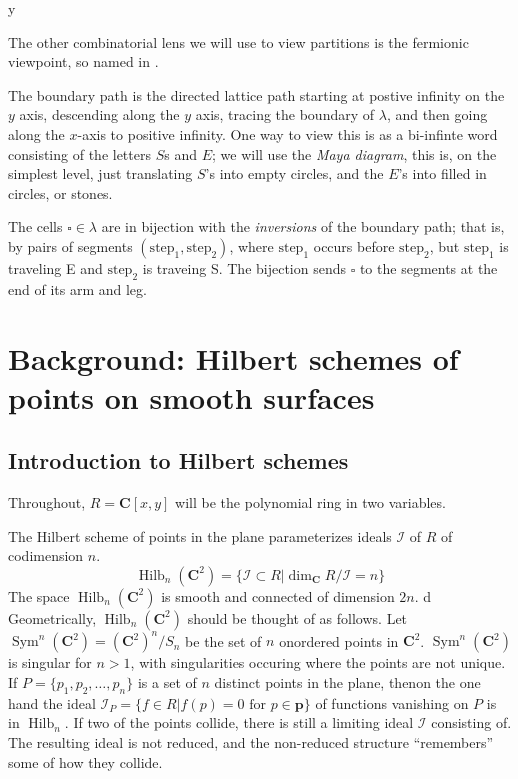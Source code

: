 y\documentclass{amsart}[12pt]
\theoremstyle{definition}
\newcommand{\C}{\mathbf{C}}
\DeclareMathOperator{\Hilb}{Hilb}
\DeclareMathOperator{\Sym}{Sym}
\begin{document}
The other combinatorial lens we will use to view partitions is the fermionic viewpoint, so named in .  

The boundary path is the directed lattice path starting at postive infinity on the $y$ axis, descending along the $y$ axis, tracing the boundary of $\lambda$, and then going along the $x$-axis to positive infinity.  One way to view this is as a bi-infinte word consisting of the letters $S$s and $E$; we will use the \emph{Maya diagram}, this is, on the simplest level, just translating $S$'s into empty circles, and the $E$'s into filled in circles, or stones.  



The cells $\square\in\lambda$ are in bijection with the
\emph{inversions} of the boundary path; that is, by pairs of segments
$(\text{step}_1, \text{step}_2)$, where $\text{step}_1$ occurs before $\text{step}_2$, but $\text{step}_1$ is traveling E and $\text{step}_2$ is traveing S.  The bijection sends $\square$ to the segments at the end of its arm and leg.





\section{Background: Hilbert schemes of points on smooth surfaces}
\label{sec:smoothbackground}



\subsection{Introduction to Hilbert schemes}

Throughout, $R=\C[x,y]$ will be the polynomial ring in two variables.  

The Hilbert scheme of points in the plane parameterizes ideals $\mathcal{I}$ of $R$ of codimension $n$.
$$\Hilb_n(\C^2)=\{\mathcal{I}\subset R | \dim_\C R/\mathcal{I}=n\}$$
The space $\Hilb_n(\C^2)$ is smooth and connected of dimension $2n$.
d
Geometrically, $\Hilb_n(\C^2)$ should be thought of as follows.  Let $\Sym^n(\C^2)=(\C^2)^n/S_n$ be the set of $n$ onordered points in $\C^2$.  $\Sym^n(\C^2)$ is singular for $n>1$, with singularities occuring where the points are not unique.  
If $P=\{p_1,p_2,\dots, p_n\}$ is a set of $n$ distinct points in the plane, thenon the one hand the ideal $\mathcal{I}_{P}=\{f\in R| f(p)=0 \text{ for }p\in \mathbf{p}\}$ of functions vanishing on $P$ is in $\Hilb_n$.  If two of the points collide, there is still a limiting ideal $\mathcal{I}$ consisting of.  The resulting ideal is not reduced, and the non-reduced structure ``remembers'' some of how they collide.
\end{document}
